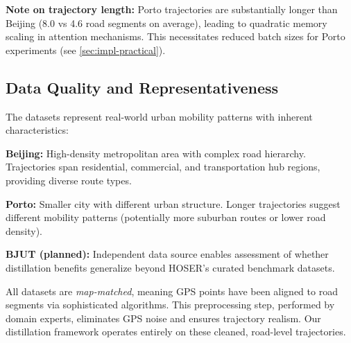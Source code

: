 \textbf{Note on trajectory length:} Porto trajectories are substantially longer than Beijing (8.0 vs 4.6 road segments on average), leading to quadratic memory scaling in attention mechanisms. This necessitates reduced batch sizes for Porto experiments (see \autoref{sec:impl-practical}).

\subsection{Data Quality and Representativeness}
\label{sec:data-quality}

The datasets represent real-world urban mobility patterns with inherent characteristics:

\textbf{Beijing:} High-density metropolitan area with complex road hierarchy. Trajectories span residential, commercial, and transportation hub regions, providing diverse route types.

\textbf{Porto:} Smaller city with different urban structure. Longer trajectories suggest different mobility patterns (potentially more suburban routes or lower road density).

\textbf{BJUT (planned):} Independent data source enables assessment of whether distillation benefits generalize beyond HOSER's curated benchmark datasets.

All datasets are \emph{map-matched}, meaning GPS points have been aligned to road segments via sophisticated algorithms. This preprocessing step, performed by domain experts, eliminates GPS noise and ensures trajectory realism. Our distillation framework operates entirely on these cleaned, road-level trajectories.


